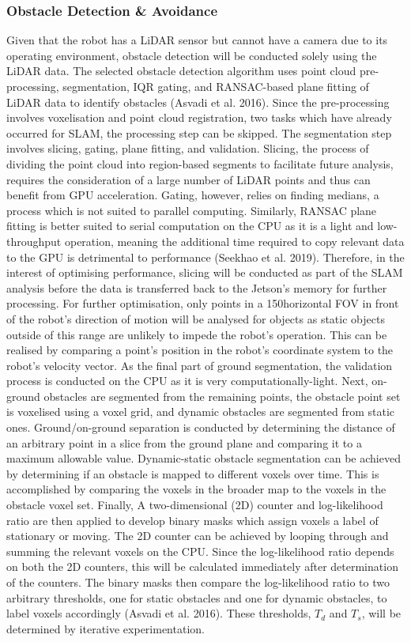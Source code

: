 \subsubsection{Obstacle Detection \& Avoidance}
Given that the robot has a LiDAR sensor but cannot have a camera due to its operating environment, obstacle detection will be conducted solely using the LiDAR data. The selected obstacle detection algorithm uses point cloud pre-processing, segmentation, IQR gating, and RANSAC-based plane fitting of LiDAR data to identify obstacles (Asvadi et al. 2016). Since the pre-processing involves voxelisation and point cloud registration, two tasks which have already occurred for SLAM, the processing step can be skipped. The segmentation step involves slicing, gating, plane fitting, and validation. Slicing, the process of dividing the point cloud into region-based segments to facilitate future analysis, requires the consideration of a large number of LiDAR points and thus can benefit from GPU acceleration. Gating, however, relies on finding medians, a process which is not suited to parallel computing. Similarly, RANSAC plane fitting is better suited to serial computation on the CPU as it is a light and low-throughput operation, meaning the additional time required to copy relevant data to the GPU is detrimental to performance (Seekhao et al. 2019). Therefore, in the interest of optimising performance, slicing will be conducted as part of the SLAM analysis before the data is transferred back to the Jetson's memory for further processing. For further optimisation, only points in a 150\textdegree \space horizontal FOV in front of the robot's direction of motion will be analysed for objects as static objects outside of this range are unlikely to impede the robot's operation. This can be realised by comparing a point's position in the robot's coordinate system to the robot's velocity vector. As the final part of ground segmentation, the validation process is conducted on the CPU as it is very computationally-light. Next, on-ground obstacles are segmented from the remaining points, the obstacle point set is voxelised using a voxel grid, and dynamic obstacles are segmented from static ones. Ground/on-ground separation is conducted by determining the distance of an arbitrary point in a slice from the ground plane and comparing it to a maximum allowable value. Dynamic-static obstacle segmentation can be achieved by determining if an obstacle is mapped to different voxels over time. This is accomplished by comparing the voxels in the broader map to the voxels in the obstacle voxel set. Finally, A two-dimensional (2D) counter and log-likelihood ratio are then applied to develop binary masks which assign voxels a label of stationary or moving. The 2D counter can be achieved by looping through and summing the relevant voxels on the CPU. Since the log-likelihood ratio depends on both the 2D counters, this will be calculated immediately after determination of the counters. The binary masks then compare the log-likelihood ratio to two arbitrary thresholds, one for static obstacles and one for dynamic obstacles, to label voxels accordingly (Asvadi et al. 2016). These thresholds, $T_d$ and $T_s$, will be determined by iterative experimentation.

